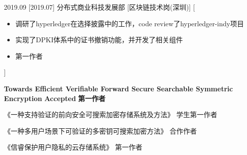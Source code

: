 \documentclass[zh]{resume}
\begin{document}
\begin{experiences}
  \experience
    {2019.09}%
    [2019.07]%
    {}%
    {分布式商业科技发展部}%
    [区块链技术岗(深圳)]%
    [\begin{itemize}
      \item{\icon{\faCheck}} 调研了hyperledger在选择披露中的工作，code review了hyperledger-indy项目
      \item{\icon{\faCheck}} 实现了DPKI体系中的证书撤销功能，并开发了相关组件 
      \item{\icon{\faCheck}}     {第一作者}
    \end{itemize}]%

\end{experiences}


\begin{myresearchs}
  \myresearch
    {\textbf{Towards Efficient Verifiable Forward Secure Searchable Symmetric Encryption}}
    {\textbf{}}
    {\textbf{Accepted}}
    {\textbf{第一作者}}%
    
  \myzhuanli
    {《一种支持验证的前向安全可搜索加密存储系统及方法》}
    {学生第一作者}

  \myzhuanli
    {《一种多用户场景下可验证的多密钥可搜索加密方法》}
    {合作作者}

  \myruanzhu
    {《信睿保护用户隐私的云存储系统》}
    {第一作者}

\end{myresearchs}
\end{document}
